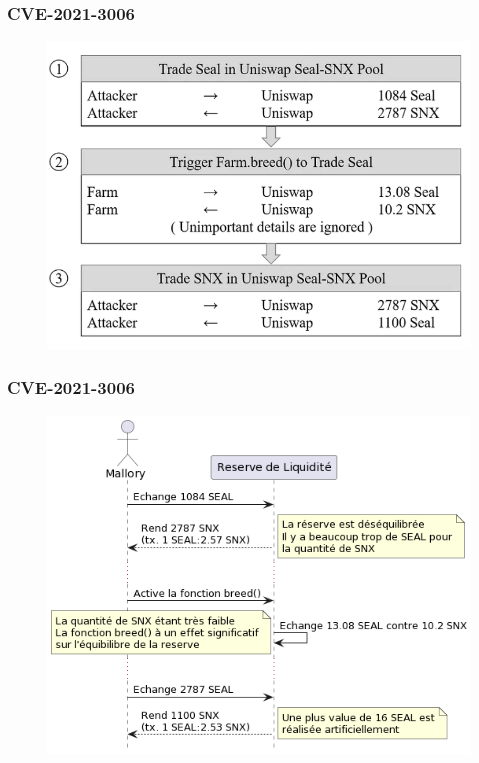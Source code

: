 \begin{frame}
    \frametitle{CVE-2021-3006}
    \begin{figure}
        \centering
        \includegraphics[scale = 0.3]{decentralisation/cve_2022_3006.png}
    \end{figure}
\end{frame}

\begin{frame}
    \frametitle{CVE-2021-3006}
    \begin{figure}
        \includegraphics[scale = 0.5]{decentralisation/cve_2021_3006_explain.png}
        \centering
    \end{figure}
\end{frame}